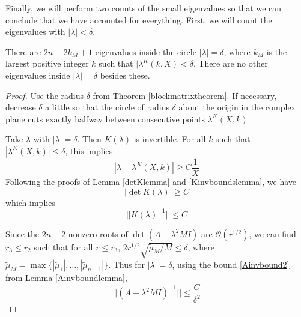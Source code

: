\documentclass[thesis.tex]{subfiles}
\begin{document}
Finally, we will perform two counts of the small eigenvalues so that we can conclude that we have accounted for everything. First, we will count the eigenvalues with $|\lambda| < \delta$.

\begin{lemma}\label{eigcount}
There are $2n + 2 k_M + 1$ eigenvalues inside the circle $|\lambda| = \delta$, where $k_M$ is the largest positive integer $k$ such that $|\lambda^K(k,X) < \delta$. There are no other eigenvalues inside $|\lambda| = \delta$ besides these.

\begin{proof}
Use the radius $\delta$ from Theorem \ref{blockmatrixtheorem}. If necessary, decrease $\delta$ a little so that the circle of radius $\delta$ about the origin in the complex plane cuts exactly halfway between consecutive points $\lambda^K(X, k)$.

Take $\lambda$ with $|\lambda| = \delta$. Then $K(\lambda)$ is invertible. For all $k$ such that $|\lambda^K(X, k)| \leq \delta$, this implies
\[
| \lambda - \lambda^K(X, k)| \geq C \frac{1}{X}
\]
Following the proofs of Lemma \ref{detKlemma} and \ref{Kinvboundslemma}, we have
\[
|\det K(\lambda)| \geq C
\]
which implies
\begin{equation}\label{Kinvbounddelta}
||K(\lambda)^{-1}|| \leq C
\end{equation}

Since the $2n-2$ nonzero roots of $\det(A - \lambda^2 M I)$ are $\mathcal{O}(r^{1/2})$, we can find $r_3 \leq r_2$ such that for all $r \leq r_3$, $2 r^{1/2} \sqrt{\tilde{\mu}_M/M} \leq \delta$, where $\tilde{\mu}_M = \max\{|\tilde{\mu}_1|, \dots, |\tilde{\mu}_{n-1}| \}$. Thus for $|\lambda| = \delta$, using the bound \eqref{Ainvbound2} from Lemma \ref{Ainvboundlemma}, 
\begin{equation}\label{Ainvbounddelta}
||(A - \lambda^2 M I)^{-1}|| \leq \frac{C}{\delta^2}
\end{equation}


\end{proof}
\end{lemma}
\end{document}
